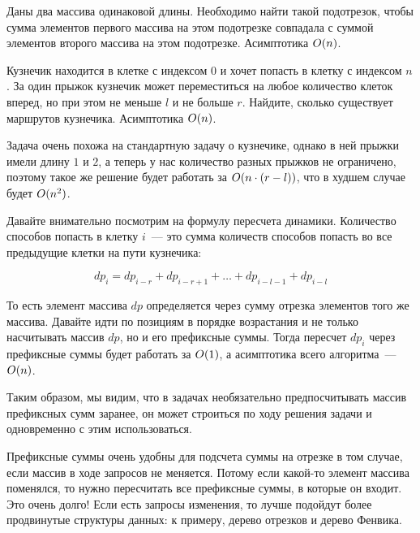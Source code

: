 \begin{exercise}
    Даны два массива одинаковой длины. Необходимо найти такой подотрезок, чтобы сумма элементов первого массива на этом подотрезке совпадала с суммой элементов второго массива на этом подотрезке. Асимптотика $O(n)$.
\end{exercise}


\begin{problem}
    Кузнечик находится в клетке с индексом $0$ и хочет попасть в клетку с индексом $n$. За один прыжок кузнечик может переместиться на любое количество клеток вперед, но при этом не меньше $l$ и не больше $r$. Найдите, сколько существует маршрутов кузнечика. Асимптотика $O(n)$.
\end{problem}

\begin{solution}
    Задача очень похожа на стандартную задачу о кузнечике, однако в ней прыжки имели длину $1$ и $2$, а теперь у нас количество разных прыжков не ограничено, поэтому такое же решение будет работать за $O(n \cdot (r - l))$, что в худшем случае будет $O(n^2)$.

    Давайте внимательно посмотрим на формулу пересчета динамики. Количество способов попасть в клетку $i$~--- это сумма количеств способов попасть во все предыдущие клетки на пути кузнечика:

$$
dp_i = dp_{i - r} + dp_{i - r + 1} + \ldots + dp_{i - l - 1} + dp_{i - l}
$$

То есть элемент массива $dp$ определяется через сумму отрезка элементов того же массива. Давайте идти по позициям в порядке возрастания и не только насчитывать массив $dp$, но и его префиксные суммы. Тогда пересчет $dp_i$ через префиксные суммы будет работать за $O(1)$, а асимптотика всего алгоритма~--- $O(n)$.

Таким образом, мы видим, что в задачах необязательно предпосчитывать массив префиксных сумм заранее, он может строиться по ходу решения задачи и одновременно с этим использоваться.
\end{solution}


\begin{observation} \label{prefix_sums:advanced:segment_tree}
Префиксные суммы очень удобны для подсчета суммы на отрезке в том случае, если массив в ходе запросов не меняется. Потому если какой-то элемент массива поменялся, то нужно пересчитать все префиксные суммы, в которые он входит. Это очень долго! Если есть запросы изменения, то лучше подойдут более продвинутые структуры данных: к примеру, дерево отрезков и дерево Фенвика.
\end{observation}

